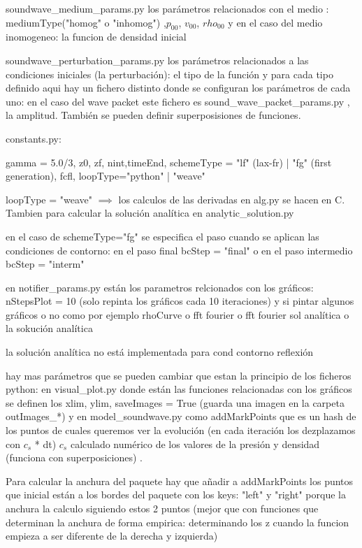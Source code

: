 \documentclass{article}
\begin{document}
\begin{description}
\begin{description}
\item soundwave\_medium\_params.py los parámetros relacionados con el medio : mediumType("homog" o "inhomog") ,$p_{00}$, $v_{00}$, $rho_{00}$ y  en el caso del medio inomogeneo: la funcion de densidad inicial
\item soundwave\_perturbation\_params.py los parámetros relacionados a las condiciones iniciales (la perturbación): el tipo de la función y para cada tipo definido aqui hay un fichero distinto donde se configuran los parámetros de cada uno: en el caso del wave packet este fichero es sound\_wave\_packet\_params.py , la amplitud. También se pueden definir superposisiones de funciones. 
\item constants.py: 
\begin{description}
\item  gamma = 5.0/3, z0, zf, nint,timeEnd, schemeType = "lf" (lax-fr) | "fg" (first generation), fcfl, loopType="python" | "weave"
\item loopType = "weave" $\implies$ los calculos de las derivadas en alg.py se hacen en C. Tambien para calcular la solución analítica en
analytic\_solution.py 
\item en el caso de schemeType="fg" se especifica el paso cuando se aplican las condiciones de contorno: en el paso final bcStep = "final" o en el paso intermedio bcStep = "interm"
\end{description}
\item en notifier\_params.py están los parametros relcionados con los gráficos: nStepsPlot = 10 (solo repinta los gráficos cada 10 iteraciones)
y si pintar algunos gráficos o no como por ejemplo rhoCurve o fft fourier o fft fourier sol analítica o la sokución analítica
\item la solución analítica no está implementada para cond contorno reflexión
\item hay mas parámetros que se pueden cambiar que estan la principio de los ficheros python: en visual\_plot.py donde están las funciones relacionadas con los gráficos se definen los xlim, ylim, saveImages = True (guarda una imagen en la carpeta outImages\_*) y en model\_soundwave.py como addMarkPoints que es un hash de los puntos de cuales queremos ver la evolución (en cada iteración los dezplazamos con $c_{s}$ * dt) $c_s$ calculado numérico de los valores de la presión y densidad (funciona con superposiciones) . 
\item Para calcular la anchura del paquete hay que añadir a addMarkPoints los puntos que inicial están a los bordes del paquete con los keys: "left"  y "right" porque la anchura la calculo siguiendo estos 2 puntos (mejor que con funciones que determinan la anchura de forma empirica: determinando los z cuando la funcion  empieza a ser diferente de la derecha y izquierda)
  

\end{description}
\end{description}
\end{document}
